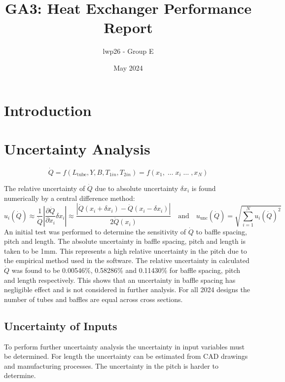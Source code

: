 \documentclass{article}
\begin{document}
\title{GA3: Heat Exchanger Performance Report}
\author{lwp26 - Group E}
\date{May 2024}
\maketitle 

\section{Introduction}

\section{Uncertainty Analysis}

\begin{equation}
    \dot{Q} = f(L_\text{tube}, Y, B, T_{1in}, T_{2in}) = f(x_1, \; \dots \; x_i \; \dots \; , x_N)
\end{equation}

The relative uncertainty of $\dot{Q}$ due to absolute uncertainty $\delta x_i$ is found numerically by a central difference method:
\begin{equation}
    u_i(\dot{Q}) \approx \frac{1}{\dot{Q}}\left|\frac{\partial \dot{Q}}{\partial x_i} \delta x_i \right| \approx \frac{ \left| \dot{Q}(x_i + \delta x_i) - \dot{Q}(x_i - \delta x_i) \right|}{2\dot{Q}(x_i)} \label{eq:central_difference} \quad \text{and} \quad u_\text{unc}(\dot{Q}) = \sqrt{\sum_{i=1}^N u_i(\dot{Q})^2}
\end{equation}
An initial test was performed to determine the sensitivity of $\dot{Q}$ to baffle spacing, pitch and length.
The absolute uncertainty in baffle spacing, pitch and length is taken to be 1mm.
This represents a high relative uncertainty in the pitch due to the empirical method used in the software.
The relative uncertainty in calculated $\dot{Q}$ was found to be 0.00546\%, 0.58286\% and 0.11430\% for baffle spacing, pitch and length respectively.
This shows that an uncertainty in baffle spacing has negligible effect and is not considered in further analysis.
For all 2024 designs the number of tubes and baffles are equal across cross sections.

\subsection{Uncertainty of Inputs}

To perform further uncertainty analysis the uncertainty in input variables must be determined.
For length the uncertainty can be estimated from CAD drawings and manufacturing processes.
The uncertainty in the pitch is harder to determine.
\end{document}
